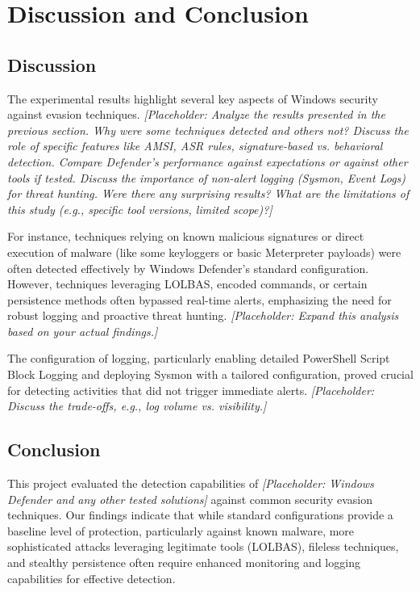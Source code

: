 \documentclass{ULBreport}
\begin{document}
\section*{Discussion and Conclusion}

\subsection{Discussion}
The experimental results highlight several key aspects of Windows security against evasion techniques. \textit{[Placeholder: Analyze the results presented in the previous section. Why were some techniques detected and others not? Discuss the role of specific features like AMSI, ASR rules, signature-based vs. behavioral detection. Compare Defender's performance against expectations or against other tools if tested. Discuss the importance of non-alert logging (Sysmon, Event Logs) for threat hunting. Were there any surprising results? What are the limitations of this study (e.g., specific tool versions, limited scope)?]}

For instance, techniques relying on known malicious signatures or direct execution of malware (like some keyloggers or basic Meterpreter payloads) were often detected effectively by Windows Defender's standard configuration. However, techniques leveraging LOLBAS, encoded commands, or certain persistence methods often bypassed real-time alerts, emphasizing the need for robust logging and proactive threat hunting. \textit{[Placeholder: Expand this analysis based on your actual findings.]}

The configuration of logging, particularly enabling detailed PowerShell Script Block Logging and deploying Sysmon with a tailored configuration, proved crucial for detecting activities that did not trigger immediate alerts. \textit{[Placeholder: Discuss the trade-offs, e.g., log volume vs. visibility.]}

\subsection{Conclusion}
This project evaluated the detection capabilities of \textit{[Placeholder: Windows Defender and any other tested solutions]} against common security evasion techniques. Our findings indicate that while standard configurations provide a baseline level of protection, particularly against known malware, more sophisticated attacks leveraging legitimate tools (LOLBAS), fileless techniques, and stealthy persistence often require enhanced monitoring and logging capabilities for effective detection.
\end{document}
